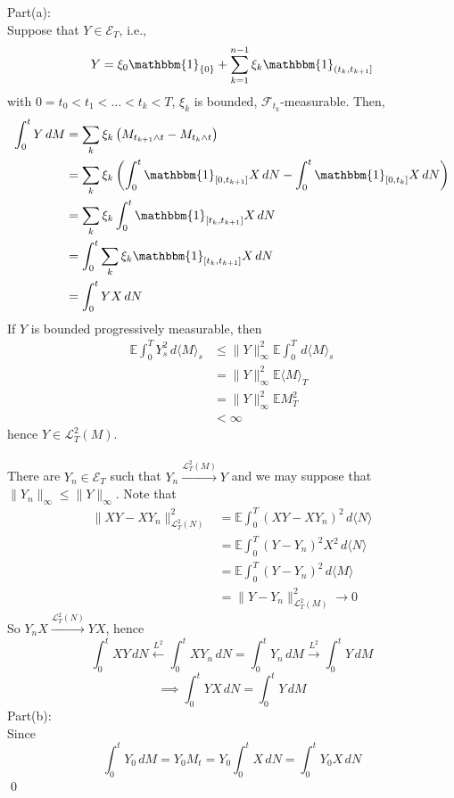 \documentclass[12pt,a4paper]{article}
\newcommand{\E}{\mathbb{E}}
\renewenvironment{proof}
    {\begin{trivlist}\item[\hskip\labelsep\color{blue}\bfseries Proof:]}
    {\qed\end{trivlist}}
\begin{document}
\begin{proof}
    Part(a):\\
    Suppose that $Y\in\mathcal{E}_T$, i.e.,
    $$
    Y = \xi_0 \mathbbm{1}_{\{0\}} + \sum_{k=1}^{n-1} \xi_k \mathbbm{1}_{(t_k, t_{k+1}]}
    $$
    with $0=t_0 < t_1 <\ldots< t_k <T$, $\xi_k$ is bounded, $\mathscr{F}_{t_k}$-measurable. Then,
    \begin{align*}
        \int_0^t Y \, dM &= \sum_k \xi_k \left(M_{t_{k+1}\wedge t}-M_{t_{k}\wedge t}\right)\\
        &= \sum_k \xi_k \left(\int_0^t \mathbbm{1}_{[0, t_{k+1}]} X\, dN-\int_0^t \mathbbm{1}_{[0, t_{k}]} X\, dN\right)\\
        &= \sum_k \xi_k \int_0^t \mathbbm{1}_{[t_{k},t_{k+1}]} X\, dN \\
        &= \int_0^t \sum_k \xi_k \mathbbm{1}_{[t_k,t_{k+1}]}X\, dN\\
        &= \int_0^t YX\, dN
    \end{align*}
    If $Y$ is bounded progressively measurable, then
    \begin{align*}
        \E \int_0^T Y_s^2\, d\langle M\rangle_s &\le \|Y\|^2_\infty \E \int_0^T \,d\langle M\rangle_s\\
        &= \|Y\|_\infty^2 \E\langle M\rangle_T\\
        &=\|Y\|_\infty^2 \E M_T^2\\
        &<\infty
    \end{align*}
    hence $Y\in\mathcal{L}^2_T(M)$.\\
    \\
    There are $Y_n\in\mathcal{E}_T$ such that $Y_n\xrightarrow{\mathcal{L}^2_T(M)} Y$ and we may suppose that $\|Y_n\|_\infty\le \|Y\|_\infty$. Note that
    \begin{align*}
        \|XY-XY_n\|^2_{\mathcal{L}^2_T(N)}&= \E \int_0^T (XY-XY_n)^2\, d\langle N\rangle\\
        &= \E\int_0^T (Y-Y_n)^2 X^2\, d\langle N\rangle\\
        &=\E\int_0^T (Y-Y_n)^2 \, d\langle M\rangle\\
        &= \|Y-Y_n\|^2_{\mathcal{L}^2_T(M)}\to 0
    \end{align*}
    So $Y_nX \xrightarrow{\mathcal{L}^2_T(N)}YX$, hence
    $$
    \int_0^t XY\, dN \xleftarrow{L^2}\int_0^t XY_n\, dN = \int_0^t Y_n\, dM \xrightarrow{L^2}\int_0^t Y\, dM
    $$
    $$
    \implies  \int_0^t YX\, dN = \int_0^t Y\, dM
    $$
    Part(b):\\
    Since 
    $$
    \int_0^t Y_0\, dM = Y_0M_t = Y_0\int_0^t X\, dN = \int_0^t Y_0X\, dN
$$
\end{proof}
\end{document}
